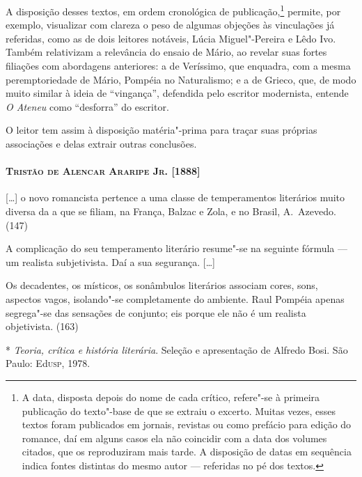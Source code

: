 A disposição desses textos, em ordem cronológica de
publicação,\footnote{ A data, disposta depois do nome de cada crítico,
refere"-se à primeira publicação do texto"-base de que se extraiu o
excerto. Muitas vezes, esses textos foram publicados em jornais,
revistas ou como prefácio para edição do romance, daí em alguns casos
ela não coincidir com a data dos volumes citados, que os reproduziram
mais tarde. A disposição de datas em sequência indica fontes distintas
do mesmo autor --- referidas no pé dos textos.} permite,
por exemplo, visualizar com clareza o peso de algumas objeções às
vinculações já referidas, como as de dois leitores notáveis, Lúcia
Miguel"-Pereira e Lêdo Ivo. Também relativizam a relevância do ensaio
de Mário, ao revelar suas fortes filiações com abordagens anteriores: a
de Veríssimo, que enquadra, com a mesma peremptoriedade de Mário,
Pompéia no Naturalismo; e a de Grieco, que, de modo muito similar à
ideia de ``vingança'', defendida pelo escritor modernista, entende
\textit{O Ateneu} como ``desforra'' do escritor. 

O leitor tem assim à disposição matéria"-prima para traçar suas
próprias associações e delas extrair outras conclusões.

\newcommand{\olho}[2]{\paragraph{\textsc{#2} [#1]}}

\olho{1888}{Tristão de Alencar Araripe Jr.}

[\ldots] o novo romancista pertence a uma classe de temperamentos
literários muito diversa da a que se filiam, na França, Balzac e Zola,
e no Brasil, A.~Azevedo. (147)

A complicação do seu temperamento literário resume"-se na seguinte
fórmula --- um realista subjetivista. Daí a sua segurança. [\ldots]

Os decadentes, os místicos, os sonâmbulos literários associam cores,
sons, aspectos vagos, isolando"-se completamente do ambiente. Raul
Pompéia apenas segrega"-se das sensações de conjunto; eis porque ele
não é um realista objetivista. (163)

\newcommand{\fontes}[1]{\begin{footnotesize}*\hspace{1ex} #1\end{footnotesize}}
\fontes{\textit{Teoria, crítica e história
literária}. Seleção e apresentação de Alfredo Bosi. São
Paulo: Ed\textsc{usp}, 1978.}

